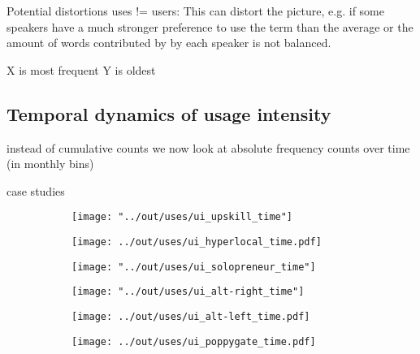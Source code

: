 \documentclass[a4paper, abstract=on]{scrartcl}
\begin{document}
    Potential distortions
      uses != users: This can distort the picture, e.g. if some speakers have a much stronger preference to use the term than the average or the amount of words contributed by by each speaker is not balanced.


      X is most frequent
      Y is oldest

  \subsection{Temporal dynamics of usage intensity}

    instead of cumulative counts we now look at absolute frequency counts over time (in monthly bins)

    case studies

      \begin{figure}
        \caption{Temporal dynamics in usage frequency for case studies.}
        \centering
        \begin{subfigure}{.3\linewidth}
          \caption{}
          \texttt{[image: "../out/uses/ui\_upskill\_time"]}
        \end{subfigure}
        \begin{subfigure}{.3\linewidth}
          \caption{}
          \texttt{[image: ../out/uses/ui\_hyperlocal\_time.pdf]}
        \end{subfigure}
        \begin{subfigure}{.3\linewidth}
          \caption{}
          \texttt{[image: "../out/uses/ui\_solopreneur\_time"]}
        \end{subfigure}

        \begin{subfigure}{.3\linewidth}
          \caption{}
          \texttt{[image: "../out/uses/ui\_alt-right\_time"]}
        \end{subfigure}
        \begin{subfigure}{.3\linewidth}
          \caption{}
          \texttt{[image: ../out/uses/ui\_alt-left\_time.pdf]}
        \end{subfigure}
        \begin{subfigure}{.3\linewidth}
          \caption{}
          \texttt{[image: ../out/uses/ui\_poppygate\_time.pdf]}
        \end{subfigure}
      \end{figure}
\end{document}
